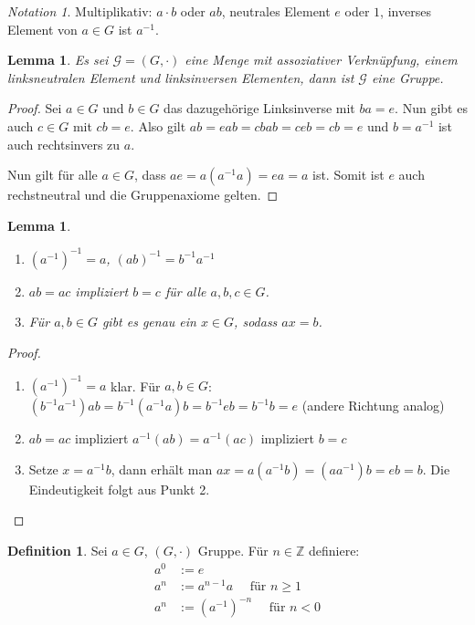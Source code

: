 \documentclass[12pt]{scrartcl} %
\newcommand{\inv}[1]{\left(#1\right)^{-1}}
\newcommand{\Inv}[1]{#1^{-1}}
\newtheorem{lemma}[thm]{Lemma}
\theoremstyle{definition}
\newtheorem*{defn}{Definition}
\theoremstyle{remark}
\newtheorem*{notation}{Notation}
\begin{document}
\begin{notation}
	Multiplikativ: $a\cdot b$ oder $ab$, neutrales Element $e$ oder $1$, inverses Element von $a\in G$ ist $\Inv a$.
\end{notation}

\begin{lemma}
	Es sei $\mathcal{G}=(G,\cdot)$ eine Menge mit assoziativer Verknüpfung, einem linksneutralen Element und linksinversen Elementen, dann ist $\mathcal{G}$ eine Gruppe.
\end{lemma}

\begin{proof}
	Sei $a\in G$ und $b\in G$ das dazugehörige Linksinverse mit $ba=e$.
	Nun gibt es auch $c\in G$ mit $cb=e$.
	Also gilt $ab=eab=cbab=ceb=cb=e$ und \(b = a^{-1}\) ist auch rechtsinvers zu \(a\).

	Nun gilt für alle $a\in G$, dass $ae=a(\Inv aa)=ea=a$ ist.
	Somit ist \(e\) auch rechstneutral und die Gruppenaxiome gelten.
\end{proof}

\begin{lemma}
	\begin{enumerate}
	\item $\inv{\Inv{a}}=a$, $\inv{ab}=\Inv b\Inv a$
	\item $ab=ac$ impliziert $b=c$ für alle $a,b,c\in G$.
	\item Für $a,b\in G$ gibt es genau ein $x\in G$, sodass $ax=b$.
	\end{enumerate}
\end{lemma}

\begin{proof}
	\begin{enumerate}
	\item $\inv{\Inv a}=a$ klar. Für $a,b\in G$: $(\Inv b\Inv a)ab=\Inv b(\Inv aa)b=\Inv beb=\Inv bb=e$ (andere Richtung analog) %
	\item $ab=ac$ impliziert $\Inv a(ab)=\Inv a(ac)$ impliziert $b=c$
	\item Setze $x=\Inv ab$, dann erhält man $ax=a(\Inv ab)=(a\Inv a)b=eb=b$.
		Die Eindeutigkeit folgt aus Punkt 2. \qedhere
	\end{enumerate}
\end{proof}

\begin{defn}
	Sei $a\in G$, $(G,\cdot)$ Gruppe.
	Für $n\in \mathbb{Z}$ definiere:
	\begin{align*}
		a^0 &:= e\\
		a^n &:= a^{n-1}a \quad \text{ für \(n\geq 1\)}\\
		a^n &:= \left(\Inv a\right)^{-n} \quad \text{ für \(n < 0\)}
	\end{align*}
\end{defn}
\end{document}
